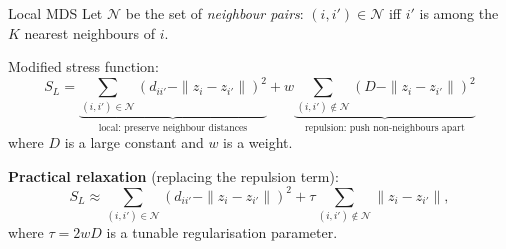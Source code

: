 \documentclass[aspectratio=169,t]{beamer}
\begin{document}

\begin{frame}{Local MDS}
  Let $\mathcal{N}$ be the set of \emph{neighbour pairs}:
  $(i,i') \in \mathcal{N}$ iff $i'$ is among the $K$ nearest neighbours of $i$.

  \vspace{0.25cm}
  Modified stress function:
  \[
    S_L = \underbrace{\sum_{(i,i')\in\mathcal{N}} \!\!(d_{ii'} - \|z_i - z_{i'}\|)^2}_{\text{local: preserve neighbour distances}}
        + w \underbrace{\sum_{(i,i')\notin\mathcal{N}} \!\!(D - \|z_i - z_{i'}\|)^2}_{\text{repulsion: push non-neighbours apart}}
  \]
  where $D$ is a large constant and $w$ is a weight.

  \vspace{0.25cm}
  \textbf{Practical relaxation} (replacing the repulsion term):
  \[
    S_L \approx \sum_{(i,i')\in\mathcal{N}} (d_{ii'} - \|z_i - z_{i'}\|)^2
              + \tau \!\!\sum_{(i,i')\notin\mathcal{N}} \|z_i - z_{i'}\|,
  \]
  where $\tau = 2wD$ is a tunable regularisation parameter.
\end{frame}
\end{document}
